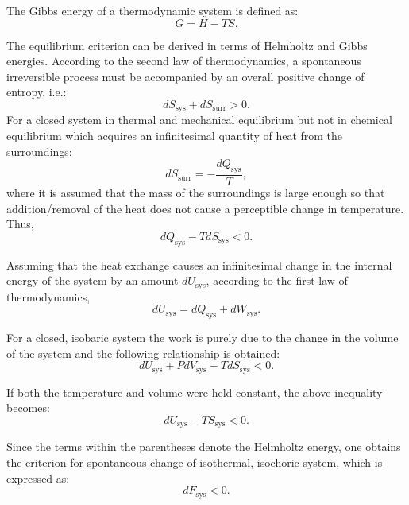     The Gibbs energy of a thermodynamic system is defined as:
    \begin{equation}
        G = H - TS.
    \end{equation}

    The equilibrium criterion can be derived in terms of Helmholtz and Gibbs energies. According to the second law of thermodynamics, a spontaneous irreversible process must be accompanied by an overall positive change of entropy, i.e.:
    \begin{equation}
        dS_\text{sys} + dS_\text{surr} > 0.
    \end{equation}
    For a closed system in thermal and mechanical equilibrium but not in chemical equilibrium which acquires an infinitesimal quantity of heat from the surroundings:
    \begin{equation}
        dS_\text{surr} = -\frac{dQ_\text{sys}}{T},
    \end{equation}
    where it is assumed that the mass of the surroundings is large enough so that addition/removal of the heat does not cause a perceptible change in temperature. Thus,
    \begin{equation}
        {dQ_\text{sys}} - T dS_\text{sys}  < 0.
    \end{equation}

    Assuming that the heat exchange causes an infinitesimal change in the internal energy of the system by an amount $dU_\text{sys}$, according to the first law of thermodynamics,
    \begin{equation}
        {dU_\text{sys}} = {dQ_\text{sys}} + {dW_\text{sys}}.
    \end{equation}

    For a closed, isobaric system the work is purely due to the change in the volume of the system and the following relationship is obtained:
    \begin{equation}
        {dU_\text{sys}} + P{dV_\text{sys}} - T{dS_\text{sys}} < 0.
    \end{equation}

    If both the temperature and volume were held constant, the above inequality becomes:
    \begin{equation}
        d{U_\text{sys} - TS_\text{sys} } < 0.
    \end{equation}

    Since the terms within the parentheses denote the Helmholtz energy, one obtains the criterion for spontaneous change of isothermal, isochoric system, which is expressed as:
    \begin{equation}
        d{F_\text{sys} } < 0.
    \end{equation}

